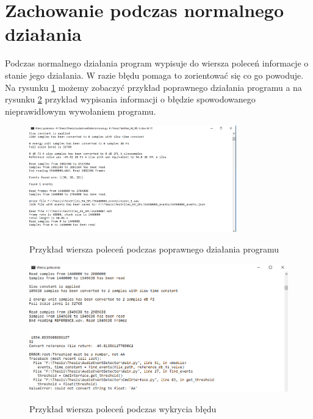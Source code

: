 \documentclass[eng,printmode]{mgr}
\begin{document}
\section{Zachowanie podczas normalnego działania}
Podczas normalnego działania program wypisuje do wiersza poleceń informacje o stanie jego działania. W razie błędu pomaga to zorientować się co go powoduje. Na rysunku \ref{poprawne_dzialanie} możemy zobaczyć przykład poprawnego działania programu a na rysunku \ref{blad} przykład wypisania informacji o błędzie spowodowanego nieprawidłowym wywołaniem programu. 

\begin{figure}[hbtp]
\caption{Przykład wiersza poleceń podczas poprawnego działania programu}
\centering
\includegraphics[width=0.8\textwidth]{poprawne_dzialanie.PNG}
\label{poprawne_dzialanie}
\end{figure}

\begin{figure}[hbtp]
\caption{Przykład wiersza poleceń podczas wykrycia błędu}
\centering
\includegraphics[scale=1]{blad.PNG}
\label{blad}
\end{figure}
\end{document}
